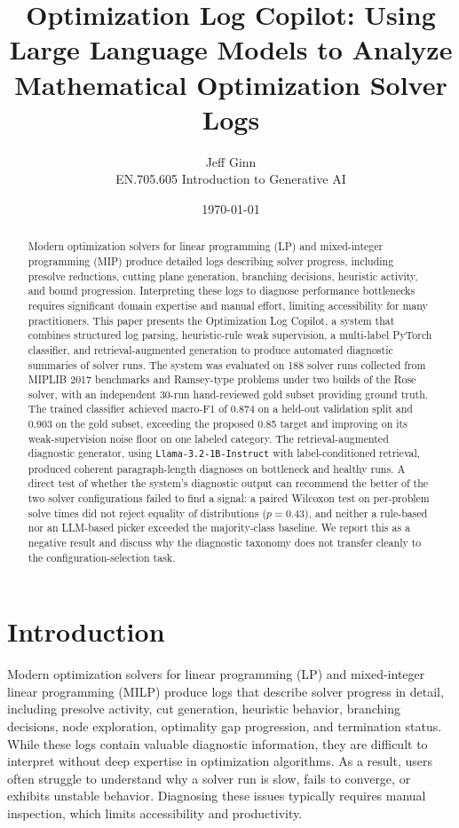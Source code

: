 \documentclass[11pt]{article}
\title{Optimization Log Copilot: Using Large Language Models to Analyze Mathematical Optimization Solver Logs}
\author{Jeff Ginn \\ EN.705.605 Introduction to Generative AI}
\date{\today}
\begin{document}
\maketitle

\begin{abstract}
Modern optimization solvers for linear programming (LP) and mixed-integer programming (MIP) produce detailed logs describing solver progress, including presolve reductions, cutting plane generation, branching decisions, heuristic activity, and bound progression. Interpreting these logs to diagnose performance bottlenecks requires significant domain expertise and manual effort, limiting accessibility for many practitioners. This paper presents the Optimization Log Copilot, a system that combines structured log parsing, heuristic-rule weak supervision, a multi-label PyTorch classifier, and retrieval-augmented generation to produce automated diagnostic summaries of solver runs. The system was evaluated on 188 solver runs collected from MIPLIB 2017 benchmarks and Ramsey-type problems under two builds of the Rose solver, with an independent 30-run hand-reviewed gold subset providing ground truth. The trained classifier achieved macro-F1 of 0.874 on a held-out validation split and 0.903 on the gold subset, exceeding the proposed 0.85 target and improving on its weak-supervision noise floor on one labeled category. The retrieval-augmented diagnostic generator, using \texttt{Llama-3.2-1B-Instruct} with label-conditioned retrieval, produced coherent paragraph-length diagnoses on bottleneck and healthy runs. A direct test of whether the system's diagnostic output can recommend the better of the two solver configurations failed to find a signal: a paired Wilcoxon test on per-problem solve times did not reject equality of distributions ($p=0.43$), and neither a rule-based nor an LLM-based picker exceeded the majority-class baseline. We report this as a negative result and discuss why the diagnostic taxonomy does not transfer cleanly to the configuration-selection task.
\end{abstract}

\section{Introduction}
\label{sec:intro}

Modern optimization solvers for linear programming (LP) and mixed-integer linear programming (MILP) produce logs that describe solver progress in detail, including presolve activity, 
cut generation, heuristic behavior, branching decisions, node exploration, optimality gap progression, and termination status. While these logs contain valuable diagnostic 
information, they are difficult to interpret without deep expertise in optimization algorithms. As a result, users often struggle to understand why a solver run is slow, 
fails to converge, or exhibits unstable behavior. Diagnosing these issues typically requires manual inspection, which limits accessibility and productivity.
\end{document}
